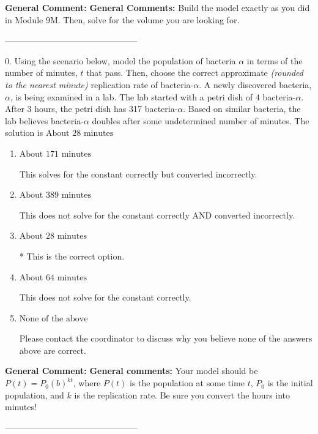 \documentclass{extbook}[14pt]
\begin{document}
\textbf{General Comment:} \textbf{General Comments:} Build the model exactly as you did in Module 9M. Then, solve for the volume you are looking for. 

-----------------------------------------------

0. Using the scenario below, model the population of bacteria $\alpha$ in terms of the number of minutes, $t$ that pass. Then, choose the correct approximate \textit{(rounded to the nearest minute)} replication rate of bacteria-$\alpha$.
A newly discovered bacteria, $\alpha$, is being examined in a lab. The lab started with a petri dish of 4 bacteria-$\alpha$. After 3 hours, the petri dish has 317 bacteria-$\alpha$. Based on similar bacteria, the lab believes bacteria-$\alpha$ doubles after some undetermined number of minutes. 
The solution is $ \text{About } 28 \text{ minutes} $ 

\begin{enumerate}[label=\Alph*.] 
\item $ \text{About } 171 \text{ minutes} $ 

 This solves for the constant correctly but converted incorrectly. 
\item $ \text{About } 389 \text{ minutes} $ 

 This does not solve for the constant correctly AND converted incorrectly. 
\item $ \text{About } 28 \text{ minutes} $ 

 * This is the correct option. 
\item $ \text{About } 64 \text{ minutes} $ 

 This does not solve for the constant correctly. 
\item $ \text{None of the above} $ 

 Please contact the coordinator to discuss why you believe none of the answers above are correct. 
\end{enumerate} 
 
\textbf{General Comment:} \textbf{General comments:} Your model should be $P(t) = P_0(b)^{kt}$, where $P(t)$ is the population at some time $t$, $P_0$ is the initial population, and $k$ is the replication rate. Be sure you convert the hours into minutes! 

-----------------------------------------------
\end{document}
